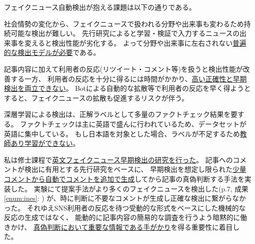 フェイクニュース自動検出が抱える課題は以下の通りである。
\vspace{-3mm}
\begin{description}
    \setlength{\parskip}{0cm}
    \setlength{\itemsep}{0cm}
    \item[分野や出来事による特異性] %
        社会情勢の変化から、フェイクニュースで扱われる分野や出来事も変わるため持続可能な検出が難しい。
        先行研究によると学習・検証で入力するニュースの出来事を変えると検出性能が劣化する\cite{Wang:2018:EEA:3219819.3219903}。
        よって分野や出来事に左右されない\underline{普遍的な検出モデルが必要}である。
    \item[早期検出と正確性の両立] %
        記事内容に加えて利用者の反応(リツイート・コメント等)を扱うと検出性能が改善する\cite{Wu:2018:TFF:3159652.3159677}一方、
        利用者の反応を十分に得るには時間がかかり、\underline{高い正確性と早期検出を両立できない}。
        Botによる自動的な拡散等で利用者の反応を早く得ようとすると、フェイクニュースの拡散も促進するリスクが伴う。
    \item[日本語データセット不足] %
        深層学習による検出は、正解ラベルとして多量のファクトチェック結果を要する。
        ファクトチェックは主に英語で盛んに行われているため、データセットが英語に集中\cite{fakenewsnet}している。
        もし日本語を対象とした場合、ラベルが不足するため\underline{教師あり学習ができない}。
    \end{description}

私は修士課程で\underline{英文フェイクニュース早期検出の研究を行った}。
記事へのコメントが検出に有用とする先行研究\cite{defend}をベースに、
早期検出を想定し限られた\underline{少量コメントから自動でコメントを追加で生成}してから記事の真偽判断する手法を実装した。
実験にて提案手法がより多くのフェイクニュースを検出した(p.7, 成果\ref{enum:ines}: \cite{ines})
が、時に判断に不要なコメントが生成し正確な検出に繋がらなかった。
それゆえSNS利用者の反応を待つ受動的な形式をベースにした機械的な反応の生成ではなく、
能動的に記事内容の簡易的な調査を行うよう暗黙的に働きかけ、
\underline{真偽判断において重要な情報である手がかり}を得る重要性に着目した。

